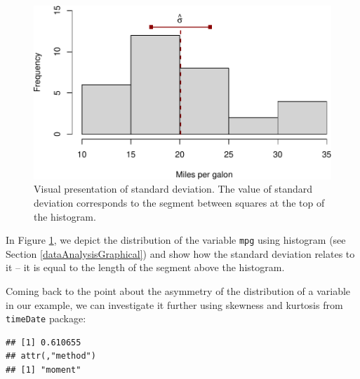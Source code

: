 \documentclass[
]{book}
\newenvironment{Shaded}{\begin{snugshade}}{\end{snugshade}}
\newcommand{\KeywordTok}[1]{\textcolor[rgb]{0.13,0.29,0.53}{\textbf{#1}}}
\newcommand{\NormalTok}[1]{#1}
\newcommand{\OperatorTok}[1]{\textcolor[rgb]{0.81,0.36,0.00}{\textbf{#1}}}
\theoremstyle{definition}
\theoremstyle{definition}
\theoremstyle{definition}
\theoremstyle{definition}
\theoremstyle{remark}
\begin{document}
\begin{figure}
\centering
\includegraphics{Svetunkov---Statistics-for-Business-Analytics_files/figure-latex/varianceVisual-1.pdf}
\caption{\label{fig:varianceVisual}Visual presentation of standard deviation. The value of standard deviation corresponds to the segment between squares at the top of the histogram.}
\end{figure}

In Figure \ref{fig:varianceVisual}, we depict the distribution of the variable \texttt{mpg} using histogram (see Section \ref{dataAnalysisGraphical}) and show how the standard deviation relates to it -- it is equal to the length of the segment above the histogram.

Coming back to the point about the asymmetry of the distribution of a variable in our example, we can investigate it further using skewness and kurtosis from \texttt{timeDate} package:

\begin{Shaded}
\end{Shaded}

\begin{verbatim}
## [1] 0.610655
## attr(,"method")
## [1] "moment"
\end{verbatim}

\begin{Shaded}
\end{Shaded}
\end{document}
